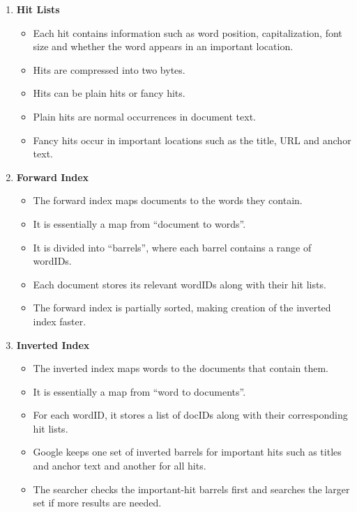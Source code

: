 \documentclass[10pt,a4paper]{article}
\begin{document}
\begin{enumerate}
    \item \textbf{Hit Lists}
    \begin{itemize}
        \item Each hit contains information such as word position, capitalization, font size and whether the word appears in an important location.
        \item Hits are compressed into two bytes.
        \item Hits can be plain hits or fancy hits.
        \item Plain hits are normal occurrences in document text.
        \item Fancy hits occur in important locations such as the title, URL and anchor text.
    \end{itemize}

    \item \textbf{Forward Index}
    \begin{itemize}
        \item The forward index maps documents to the words they contain.
        \item It is essentially a map from ``document to words''.
        \item It is divided into ``barrels'', where each barrel contains a range of wordIDs.
        \item Each document stores its relevant wordIDs along with their hit lists.
        \item The forward index is partially sorted, making creation of the inverted index faster.
    \end{itemize}

    \item \textbf{Inverted Index}
    \begin{itemize}
        \item The inverted index maps words to the documents that contain them.
        \item It is essentially a map from ``word to documents''.
        \item For each wordID, it stores a list of docIDs along with their corresponding hit lists.
        \item Google keeps one set of inverted barrels for important hits such as titles and anchor text and another for all hits.
        \item The searcher checks the important-hit barrels first and searches the larger set if more results are needed.
    \end{itemize}
\end{enumerate}
\end{document}

